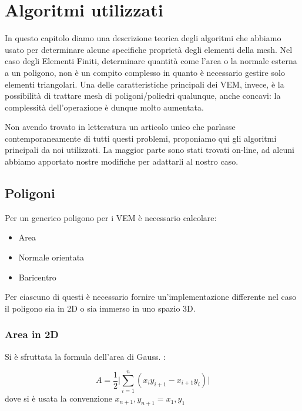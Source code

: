 \documentclass[oneside,12pt]{book}  %
\theoremstyle{plain}
\theoremstyle{definition}
\theoremstyle{remark}
\numberwithin{equation}{chapter} %
\begin{document}

\chapter{Algoritmi utilizzati}
\label{ch:algorithms}
In questo capitolo diamo una descrizione teorica degli algoritmi che
abbiamo usato per determinare alcune specifiche propriet\`a degli
elementi della mesh. Nel caso degli Elementi Finiti, determinare
quantit\`a come l'area o la normale esterna a un poligono, non \`e un
compito complesso in quanto \`e necessario gestire solo elementi
triangolari.
Una delle caratteristiche principali dei VEM, invece, \`e la
possibilit\`a di trattare mesh di poligoni/poliedri qualunque, anche concavi:
la complessit\`a dell'operazione \`e dunque molto aumentata.

Non avendo trovato in letteratura un articolo unico che parlasse
contemporaneamente di tutti questi problemi, proponiamo qui gli
algoritmi principali da noi utilizzati. La maggior parte sono stati
trovati on-line, ad alcuni abbiamo apportato nostre modifiche per
adattarli al nostro caso.

\section{Poligoni}
Per un generico poligono per i VEM \`e necessario calcolare:
\begin{itemize}
\item Area
\item Normale orientata
\item Baricentro
\end{itemize}

Per ciascuno di questi \`e necessario fornire un'implementazione
differente nel caso il poligono sia in 2D o sia immerso in uno spazio 3D.

\subsection{Area in 2D}
Si \`e sfruttata la formula dell'area di Gauss. \cite{wiki:areaGauss}:

$$ A=\frac{1}{2} \bigg | \sum_{i=1}^n (x_iy_{i+1}-x_{i+1}y_i) \bigg
|$$
dove si \`e usata la convenzione $x_{n+1},y_{n+1}=x_1,y_1$

\end{document}

